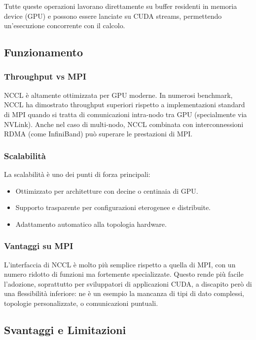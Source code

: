 Tutte queste operazioni lavorano direttamente su buffer residenti in memoria device (GPU) e possono essere lanciate su CUDA streams, permettendo un'esecuzione concorrente con il calcolo.

\subsection{Funzionamento}

\subsubsection{Throughput vs MPI}

NCCL è altamente ottimizzata per GPU moderne. In numerosi benchmark, NCCL ha dimostrato throughput superiori rispetto a implementazioni standard di MPI quando si tratta di comunicazioni intra-nodo tra GPU (specialmente via NVLink). Anche nel caso di multi-nodo, NCCL combinata con interconnessioni RDMA (come InfiniBand) può superare le prestazioni di MPI.

\subsubsection{Scalabilità}

La scalabilità è uno dei punti di forza principali:

\begin{itemize}
    \item Ottimizzato per architetture con decine o centinaia di GPU.
    \item Supporto trasparente per configurazioni eterogenee e distribuite.
    \item Adattamento automatico alla topologia hardware.
\end{itemize}

\subsubsection{Vantaggi su MPI}

L'interfaccia di NCCL è molto più semplice rispetto a quella di MPI, con un numero ridotto di funzioni ma fortemente specializzate. Questo rende più facile l’adozione, soprattutto per sviluppatori di applicazioni CUDA, a discapito però di una flessibilità inferiore: ne è un esempio la mancanza di tipi di dato complessi, topologie personalizzate, o comunicazioni puntuali.

\subsection{Svantaggi e Limitazioni}

